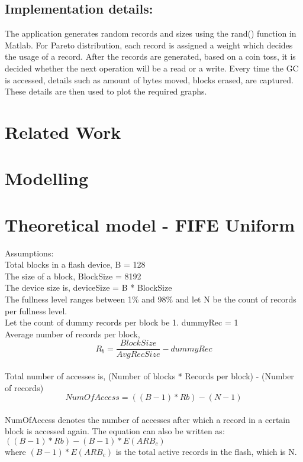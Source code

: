 \documentclass[11pt]{report} %
\begin{document}
\subsection*{Implementation details:}
The application generates random records and sizes using the rand() function in Matlab. For Pareto distribution, each record is assigned a weight which decides the usage of a record. After the records are generated, based on a coin toss, it is decided whether the next operation will be a read or a write. Every time the GC is accessed, details such as amount of bytes moved, blocks erased, are captured. These details are then used to plot the required graphs. 

\section{Related Work}

\section{Modelling}

\section{Theoretical model - FIFE Uniform}

Assumptions:\\
Total blocks in a flash device, B = 128\\
The size of a block, BlockSize = 8192\\
The device size is, deviceSize = B * BlockSize\\
The fullness level ranges between 1\% and 98\% and let N be the count of records per fullness level.\\
Let the count of dummy records per block be 1. dummyRec = 1\\
Average number of records per block, 
\begin{equation}R_b = \frac{BlockSize}{AvgRecSize} - dummyRec\end{equation}\\


Total number of accesses is, (Number of blocks * Records per block) - (Number of records)\\
\begin{equation}NumOfAccess = ((B-1) * Rb) -  (N-1)\end{equation}\\
NumOfAccess denotes the number of accesses after which a record in a certain block is accessed again. The equation can also be written as: $((B-1) * Rb) - (B-1) * E(ARB_c)$\\
where $(B-1) * E(ARB_c)$ is the total active records in the flash, which is N.\\
\\
\end{document}
